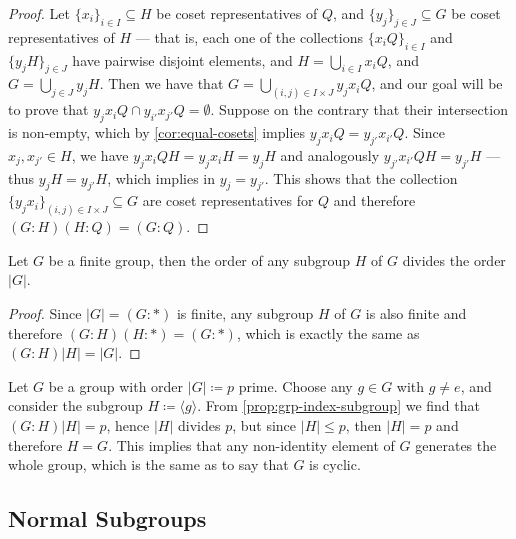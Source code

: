 \begin{proof}
Let \(\{x_{i}\}_{i \in I} \subseteq H\) be coset representatives of \(Q\), and
\(\{y_{j}\}_{j \in J} \subseteq G\) be coset representatives of \(H\) --- that
is, each one of the collections \(\{x_i Q\}_{i \in I}\) and \(\{y_{j} H\}_{j \in
J}\) have pairwise disjoint elements, and \(H = \bigcup_{i \in I} x_i Q\), and
\(G = \bigcup_{j \in J} y_j H\). Then we have that \(G = \bigcup_{(i, j) \in I
\times J} y_j x_i Q\), and our goal will be to prove that \(y_j x_i Q \cap
y_{i'} x_{j'} Q = \emptyset\). Suppose on the contrary that their intersection
is non-empty, which by \cref{cor:equal-cosets} implies \(y_j x_i Q = y_{j'}
x_{i'} Q\). Since \(x_j, x_{j'} \in H\), we have \(y_j x_i Q H = y_j x_i H = y_j
H\) and analogously \(y_{j'} x_{i'} Q H = y_{j'} H\) --- thus \(y_j H = y_{j'}
H\), which implies in \(y_j = y_{j'}\). This shows that the collection \(\{y_{j}
x_i\}_{(i, j) \in I \times J} \subseteq G\) are coset representatives for \(Q\)
and therefore \((G : H) (H : Q) = (G : Q)\).
\end{proof}

\begin{corollary}
\label{cor:order-subgroup-divides-order-group}
Let \(G\) be a finite group, then the order of any subgroup \(H\) of \(G\)
divides the order \(|G|\).
\end{corollary}

\begin{proof}
Since \(|G| = (G : *)\) is finite, any subgroup \(H\) of \(G\) is also finite
and therefore \((G : H) (H : *) = (G : *)\), which is exactly the same as \((G :
H) |H| = |G|\).
\end{proof}

\begin{example}
\label{exp:grp-prime-order-cyclic}
Let \(G\) be a group with order \(|G| \coloneq p\) prime. Choose any \(g \in G\)
with \(g \neq e\), and consider the subgroup \(H \coloneq \langle g
\rangle\). From \cref{prop:grp-index-subgroup} we find that \((G : H) |H| = p\),
hence \(|H|\) divides \(p\), but since \(|H| \leq p\), then \(|H| = p\) and
therefore \(H = G\). This implies that any non-identity element of \(G\)
generates the whole group, which is the same as to say that \(G\) is cyclic.
\end{example}

\subsection{Normal Subgroups}

